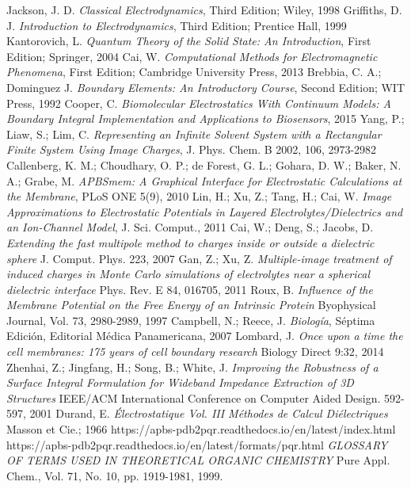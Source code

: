 \documentclass[12pt, oneside, numbers, spanish]{ezthesis}
\numberwithin{equation}{section}
\begin{document}
\begin{thebibliography}{150}
Jackson, J. D. \textit{Classical Electrodynamics}, Third Edition; Wiley, 1998
Griffiths, D. J. \textit{Introduction to Electrodynamics}, Third Edition; Prentice Hall, 1999
Kantorovich, L. \textit{Quantum Theory of the Solid State: An Introduction}, First Edition; Springer, 2004
Cai, W. \textit{Computational Methods for Electromagnetic Phenomena}, First Edition; Cambridge University Press, 2013
Brebbia, C. A.; Dominguez J. \textit{Boundary Elements: An Introductory Course}, Second Edition; WIT Press, 1992
Cooper, C. \textit{Biomolecular Electrostatics With Continuum Models: A Boundary Integral Implementation and Applications to Biosensors}, 2015
Yang, P.; Liaw, S.; Lim, C. \textit{Representing an Infinite Solvent System with a Rectangular Finite System Using Image Charges}, J. Phys. Chem. B 2002, 106, 2973-2982
Callenberg, K. M.; Choudhary, O. P.; de Forest, G. L.; Gohara, D. W.; Baker, N. A.; Grabe, M. \textit{APBSmem: A Graphical Interface for Electrostatic Calculations at the Membrane}, PLoS ONE 5(9), 2010
Lin, H.; Xu, Z.; Tang, H.; Cai, W. \textit{Image Approximations to Electrostatic Potentials in Layered Electrolytes/Dielectrics and an Ion-Channel Model}, J. Sci. Comput., 2011
Cai, W.; Deng, S.; Jacobs, D. \textit{Extending the fast multipole method to charges inside or outside a dielectric sphere} J. Comput. Phys. 223, 2007
Gan, Z.; Xu, Z. \textit{Multiple-image treatment of induced charges in Monte Carlo simulations of electrolytes near a spherical dielectric interface} Phys. Rev. E 84, 016705, 2011
Roux, B. \textit{Influence of the Membrane Potential on the Free Energy of an Intrinsic Protein} Byophysical Journal, Vol. 73, 2980-2989, 1997
Campbell, N.; Reece, J. \textit{Biología}, Séptima Edición, Editorial Médica Panamericana, 2007
Lombard, J. \textit{Once upon a time the cell membranes: 175 years of cell boundary research} Biology Direct 9:32, 2014
Zhenhai, Z.; Jingfang, H.; Song, B.; White, J. \textit{Improving the Robustness of a Surface Integral Formulation for Wideband Impedance Extraction of 3D Structures} IEEE/ACM International Conference on Computer Aided Design. 592-597, 2001 
Durand, E. \textit{Électrostatique Vol. III Méthodes de Calcul Diélectriques} Masson et Cie.; 1966
https://apbs-pdb2pqr.readthedocs.io/en/latest/index.html
https://apbs-pdb2pqr.readthedocs.io/en/latest/formats/pqr.html
\textit{GLOSSARY OF TERMS USED IN THEORETICAL ORGANIC CHEMISTRY} Pure Appl. Chem., Vol. 71, No. 10, pp. 1919-1981, 1999.
\end{thebibliography}
\end{document}
